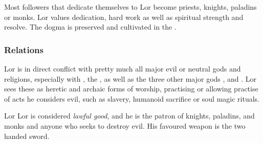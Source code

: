 Most followers that dedicate themselves to Lor become priests, knights,
paladins or monks. Lor values dedication, hard work as well as spiritual
strength and resolve. The dogma is preserved and cultivated in the
.

\subsubsection{Relations}

Lor is in direct conflict with pretty much all major evil or neutral gods and
religions, especially with , the ,
as well as the three other major gods , 
and . Lor sees these as heretic and archaic forms of
worship, practising or allowing practise of acts he considers evil, such as
slavery, humanoid sacrifice or soul magic rituals.

\begin{35e}{Lor}
  Lor is considered \emph{lawful good}, and he is the patron of knights,
  paladins, and monks and anyone who seeks to destroy evil. His favoured
  weapon is the two handed sword.
\end{35e}
